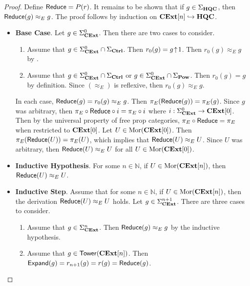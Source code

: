 \begin{proof}
    Define $\mathsf{Reduce} = P( r )$.
    It remains to be shown that if $g \in \Sigma_{\mathbf{HQC}}$, then $\mathsf{Reduce}( g ) \approx_E g$.
    The proof follows by induction on $\mathbf{CExt}[n] \hookrightarrow \mathbf{HQC}$.
    \begin{itemize}
    \item \textbf{Base Case}.
          Let $g \in \Sigma_{\mathbf{CExt}}^0$.
          Then there are two cases to consider.
          \begin{enumerate}
          \item Assume that $g \in \Sigma_{\mathbf{CExt}}^0 \cap \Sigma_{\textbf{Ctrl}}$.
                Then $r_0( g ) = g \!\uparrow\! 1$.
                Then $r_0( g ) \approx_E g$ by \HqcPowId.
          \item Assume that $g \in \Sigma_{\mathbf{CExt}}^0 \cap \Sigma_{\textbf{Ctrl}}$ or $g \in \Sigma_{\mathbf{CExt}}^0 \cap \Sigma_{\textbf{Pow}}$.
                Then $r_0( g ) = g$ by definition.
                Since $( \approx_E )$ is reflexive, then $r_0( g ) \approx_E g$.
          \end{enumerate}
          In each case, $\mathsf{Reduce}( g ) = r_0( g ) \approx_E g$.
          Then $\pi_E( \mathsf{Reduce}( g ) ) = \pi_E( g )$.
          Since $g$ was arbitrary, then $\pi_E \circ \mathsf{Reduce} \circ i = \pi_E \circ i$ where $i: \Sigma_{\mathbf{CExt}}^0 \to \mathbf{CExt}[0]$.
          Then by the universal property of free prop categories, $\pi_E \circ \mathsf{Reduce} = \pi_E$ when restricted to $\mathbf{CExt}[0]$.
          Let $U \in \operatorname{Mor}( \mathbf{CExt}[0] )$.
          Then $\pi_E( \mathsf{Reduce}( U ) ) = \pi_E( U )$, which implies that $\mathsf{Reduce}( U ) \approx_E U$.
          Since $U$ was arbitrary, then $\mathsf{Reduce}( U ) \approx_E U$ for all $U \in \operatorname{Mor}( \mathbf{CExt}[0] )$.
    \item \textbf{Inductive Hypothesis}.
          For some $n \in \mathbb{N}$, if $U \in \operatorname{Mor}( \mathbf{CExt}[n] )$, then $\mathsf{Reduce}( U ) \approx_E U$.
    \item \textbf{Inductive Step}.
          Assume that for some $n \in \mathbb{N}$, if $U \in \operatorname{Mor}( \mathbf{CExt}[n] )$, then the derivation $\mathsf{Reduce}( U ) \approx_E U$ holds.
          Let $g \in \Sigma_{\mathbf{CExt}}^{n+1}$.
          There are three cases to consider.
          \begin{enumerate}
          \item Assume that $g \in \Sigma_{\mathbf{CExt}}^n$.
                Then $\mathsf{Reduce}( g ) \approx_E g$ by the inductive hypothesis.
          \item Assume that $g \in \mathsf{Tower}( \mathbf{CExt}[n] )$.
                Then $\mathsf{Expand}( g ) = r_{n+1}( g ) = r( g ) = \mathsf{Reduce}( g )$.

\end{enumerate}
\end{itemize}
\end{proof}
